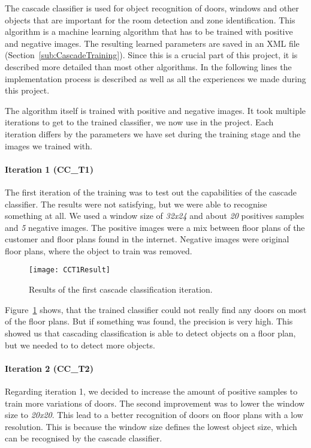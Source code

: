 The cascade classifier is used for object recognition of doors, windows and other objects that are important for the room detection and zone identification. This algorithm is a machine learning algorithm that has to be trained with positive and negative images. The resulting learned parameters are saved in an XML file (Section~\ref{sub:CascadeTraining}).  Since this is a crucial part of this project, it is described more detailed than most other algorithms. In the following lines the implementation process is described as well as all the experiences we made during this project.

The algorithm itself is trained with positive and negative images. It took multiple iterations to get to the trained classifier, we now use in the project. Each iteration differs by the parameters we have set during the training stage and the images we trained with.

\paragraph{Iteration 1 (CC\_T1)}
\label{sub:CCT1}
The first iteration of the training was to test out the capabilities of the cascade classifier. The results were not satisfying, but we were able to recognise something at all. We used a window size of \textit{32x24} and about \textit{20} positives samples and \textit{5} negative images. The positive images were a mix between floor plans of the customer and floor plans found in the internet. Negative images were original floor plans, where the object to train was removed.

\begin{figure}[H]
	\centering
	\texttt{[image: CCT1Result]}
	\caption{Results of the first cascade classification iteration.}
	\label{fig:CCT1Result}
\end{figure}

Figure~\ref{fig:CCT1Result} shows, that the trained classifier could not really find any doors on most of the floor plans. But if something was found, the precision is very high. This showed us that cascading classification is able to detect objects on a floor plan, but we needed to to detect more objects.

\paragraph{Iteration 2 (CC\_T2)}
\label{sub:CCT2}

Regarding iteration 1, we decided to increase the amount of positive samples to train more variations of doors. The second improvement was to lower the window size to \textit{20x20}. This lead to a better recognition of doors on floor plans with a low resolution. This is because the window size defines the lowest object size, which can be recognised by the cascade classifier.

